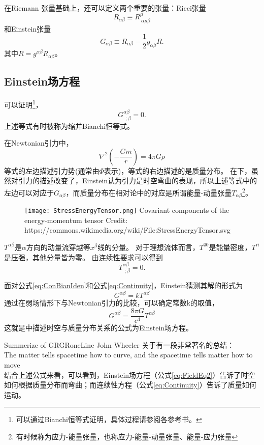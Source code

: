 在Riemann 张量基础上，还可以定义两个重要的张量：Ricci张量
\begin{equation}\label{eq:RicciTensor}
  R_{\alpha\beta} \equiv R^\mu_{~\alpha\mu\beta}
\end{equation}
和Einstein张量
\begin{equation}\label{eq:EinsteinTensor}
  G_{\alpha\beta} \equiv R_{\alpha\beta} -\frac{1}{2}g_{\alpha\beta}R.
\end{equation}
其中$R =g^{\alpha\beta}R_{\alpha\beta}$。

\subsection{Einstein场方程}

可以证明\footnote{可以通过Bianchi恒等式证明，具体过程请参阅各参考书。}，
\begin{equation}\label{eq:ConBianIden}
  G^{\alpha\beta}_{~~;\beta} =0.
\end{equation}
上述等式有时被称为缩并Bianchi恒等式。

在Newtonian引力中，
\begin{equation}\label{eq:NewtonPoisson}
  \nabla ^2 \left(-\frac{Gm}{r}\right) = 4\pi G \rho
\end{equation}
等式的左边描述引力势(通常由$\Phi$表示)，等式的右边描述的是质量分布。
在\GR 下，虽然对引力的描述改变了，Einstein认为引力是时空弯曲的表现，所以上述等式中的左边可以对应于$G_{\alpha\beta}$，而质量分布在相对论中的对应是所谓能量-动量张量$T_{\alpha\beta}$\footnote{有时候称为应力-能量张量，也称应力-能量-动量张量、能量-应力张量}。
\begin{figure}[htp]
\centering
\texttt{[image: StressEnergyTensor.png]}
  {Covariant components of the energy-momentum tensor Credit: https://commons.wikimedia.org/wiki/File:StressEnergyTensor.svg}
\label{fig:Tmunu}
\end{figure}
$T^{\alpha\beta}$是$\alpha$方向的动量流穿越等$x^\beta$线的分量。
对于理想流体而言，$T^{00}$是能量密度，$T^{ii}$是压强，其他分量皆为零。
由连续性要求可以得到
\begin{equation}\label{eq:Continuity}
  T^{\alpha\beta}_{~~;\beta} =0.
\end{equation}
 
面对公式\ref{eq:ConBianIden}和公式\ref{eq:Continuity}，Einstein猜测其解的形式为
\begin{equation}\label{eq:FieldEq1}
  G^{\alpha\beta} =kT^{\alpha\beta}
\end{equation}
通过在弱场情形下与Newtonian引力的比较，可以确定常数k的取值，
\begin{equation}\label{eq:FieldEq2}
  G^{\alpha\beta} =\frac{8\pi G}{c^4}T^{\alpha\beta}
\end{equation}
这就是\GR 中描述时空与质量分布关系的公式为Einstein场方程。

\begin{myprop}{Summerize of GR}{GRoneLine}
John Wheeler 关于\GR 有一段非常著名的总结：\\
The matter tells spacetime how to curve, and the spacetime tells matter how to move\\
  结合上述公式来看，可以看到，Einstein场方程（公式\ref{eq:FieldEq2}）告诉了时空如何根据质量分布而弯曲；而连续性方程（公式\ref{eq:Continuity}）告诉了质量如何运动。
\end{myprop}
